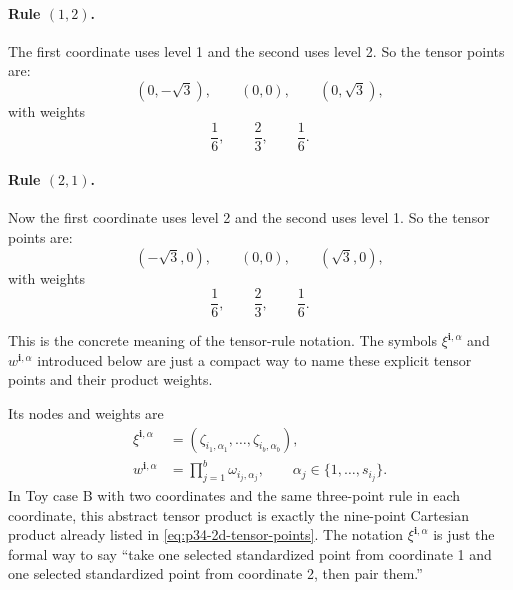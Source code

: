 \documentclass[11pt]{article}
\numberwithin{equation}{section}
\begin{document}
\paragraph{Rule \texorpdfstring{\((1,2)\)}{(1,2)}.}
The first coordinate uses level 1 and the second uses level 2.  So the tensor
points are:
\begin{equation}
  (0,-\sqrt3),\qquad (0,0),\qquad (0,\sqrt3),
  \label{eq:p36-rule-12-points}
\end{equation}
with weights
\begin{equation}
  \frac16,\qquad \frac23,\qquad \frac16.
  \label{eq:p36-rule-12-weights}
\end{equation}

\paragraph{Rule \texorpdfstring{\((2,1)\)}{(2,1)}.}
Now the first coordinate uses level 2 and the second uses level 1.  So the
tensor points are:
\begin{equation}
  (-\sqrt3,0),\qquad (0,0),\qquad (\sqrt3,0),
  \label{eq:p36-rule-21-points}
\end{equation}
with weights
\begin{equation}
  \frac16,\qquad \frac23,\qquad \frac16.
  \label{eq:p36-rule-21-weights}
\end{equation}

This is the concrete meaning of the tensor-rule notation.  The symbols
\(\xi^{\mathbf i,\alpha}\) and \(w^{\mathbf i,\alpha}\) introduced below are just
a compact way to name these explicit tensor points and their product weights.

Its nodes and weights are
\begin{align}
  \xi^{\mathbf i,\alpha}
  &=
  (\zeta_{i_1,\alpha_1},\ldots,\zeta_{i_b,\alpha_b}),
  \label{eq:p31-tensor-node}\\
  w^{\mathbf i,\alpha}
  &=
  \prod_{j=1}^b\omega_{i_j,\alpha_j},
  \qquad
  \alpha_j\in\{1,\ldots,s_{i_j}\}.
  \label{eq:p31-tensor-weight}
\end{align}
In Toy case B with two coordinates and the same three-point rule in each
coordinate, this abstract tensor product is exactly the nine-point Cartesian
product already listed in \eqref{eq:p34-2d-tensor-points}.  The notation
\(\xi^{\mathbf i,\alpha}\) is just the formal way to say ``take one selected
standardized point from coordinate 1 and one selected standardized point from
coordinate 2, then pair them.''
\end{document}
